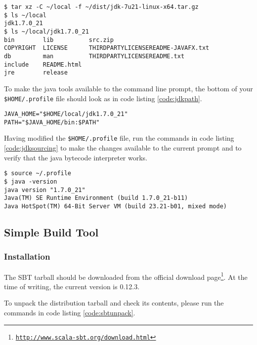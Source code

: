 \begin{lstlisting}[label=code:jdkunpack,caption=Unpacking the tarball to the \texttt{local} directory and checking its contents]
$ tar xz -C ~/local -f ~/dist/jdk-7u21-linux-x64.tar.gz 
$ ls ~/local
jdk1.7.0_21
$ ls ~/local/jdk1.7.0_21
bin        lib          src.zip
COPYRIGHT  LICENSE      THIRDPARTYLICENSEREADME-JAVAFX.txt
db         man          THIRDPARTYLICENSEREADME.txt
include    README.html
jre        release
\end{lstlisting}
 
To make the java tools available to the command line prompt, the bottom
of your \texttt{\$HOME/.profile} file should look as in code listing
\ref{code:jdkpath}.

\begin{lstlisting}[label=code:jdkpath,caption=Code to add to the bottom of the \texttt{\$HOME/.profile} file]
JAVA_HOME="$HOME/local/jdk1.7.0_21"
PATH="$JAVA_HOME/bin:$PATH"
\end{lstlisting}

Having modified the \texttt{\$HOME/.profile} file, run the commands in
code listing \ref{code:jdksourcing} to make the changes available to the
current prompt and to verify that the java bytecode interpreter works.

\begin{lstlisting}[label=code:jdksourcing,caption=Sourcing the \texttt{\$HOME/.profile} file and verifying the java interpreter]
$ source ~/.profile
$ java -version
java version "1.7.0_21"
Java(TM) SE Runtime Environment (build 1.7.0_21-b11)
Java HotSpot(TM) 64-Bit Server VM (build 23.21-b01, mixed mode)  
\end{lstlisting}

\subsection{Simple Build Tool}
\subsubsection{Installation}

The \ac{SBT} tarball should be downloaded from the official download
page\footnote{\href{http://www.scala-sbt.org/download.html}{\texttt{http://www.scala-sbt.org/download.html}}}.
At the time of writing, the current version is 0.12.3.

To unpack the distribution tarball and check its contents, please run
the commands in code listing \ref{code:sbtunpack}.

